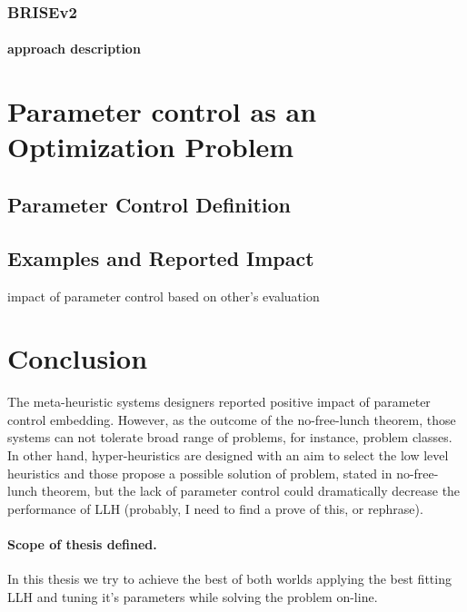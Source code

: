 \subsubsection{BRISEv2}
\paragraph{approach description}


\section{Parameter control as an Optimization Problem}\label{bg: parameter control}
\subsection{Parameter Control Definition}
\subsection{Examples and Reported Impact}
impact of parameter control based on other's evaluation


\section{Conclusion}

The meta-heuristic systems designers reported positive impact of parameter control embedding. 
However, as the outcome of the no-free-lunch theorem, those systems can not tolerate broad range of problems, for instance, problem classes.
In other hand, hyper-heuristics are designed with an aim to select the low level heuristics and those propose a possible solution of problem, stated in no-free-lunch theorem, but the lack of parameter control could dramatically decrease the performance of LLH (probably, I need to find a prove of this, or rephrase).

\paragraph{Scope of thesis defined.} In this thesis we try to achieve the best of both worlds applying the best fitting LLH and tuning it's parameters while solving the problem on-line.
